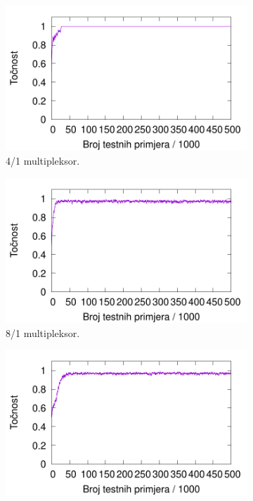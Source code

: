 \documentclass[times, utf8, zavrsni]{fer}
\begin{document}
\begin{figure}[!h]
    \centering
    \begin{subfigure}{0.496\textwidth}
        \centering
        \includegraphics[width=\textwidth]{img/multiplexer/6muxre.pdf}
        \caption{4/1 multipleksor.}
        \label{fig:6muxre}
    \end{subfigure}
    \begin{subfigure}{0.496\textwidth}
        \centering
        \includegraphics[width=\textwidth]{img/multiplexer/11muxre.pdf}
        \caption{8/1 multipleksor.}
        \label{fig:11muxre}
    \end{subfigure}
    \begin{subfigure}{0.496\textwidth}
        \centering
        \includegraphics[width=\textwidth]{img/multiplexer/20muxre.pdf}

\end{subfigure}
\end{figure}
\end{document}
